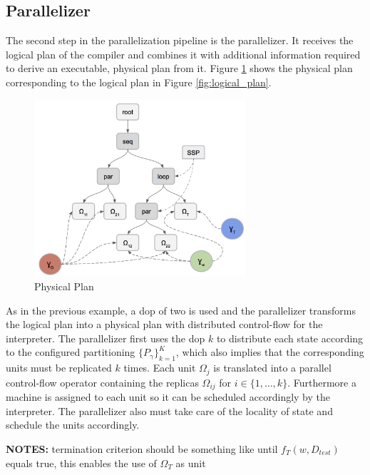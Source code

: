 \subsection{Parallelizer}
The second step in the parallelization pipeline is the parallelizer.
It receives the logical plan of the compiler and combines it with additional information required to derive an executable, physical plan from it.
Figure \ref{fig:physical_plan} shows the physical plan corresponding to the logical plan in Figure \ref{fig:logical_plan}.
\begin{figure}[ht]
\centering
\includegraphics[width=0.7\textwidth]{img/physical_plan.png}
\caption{Physical Plan}
\label{fig:physical_plan}
\end{figure}
As in the previous example, a dop of two is used and the parallelizer transforms the logical plan into a physical plan with distributed control-flow for the interpreter.
The parallelizer first uses the dop $k$ to distribute each state according to the configured partitioning $\{P_{\gamma}\}_{k=1}^K$, which also implies that the corresponding units must be replicated $k$ times.
Each unit $\Omega_j$ is translated into a parallel control-flow operator containing the replicas $\Omega_{ij}$ for $i \in \{1, \ldots, k\}$.
Furthermore a machine is assigned to each unit so it can be scheduled accordingly by the interpreter.
The parallelizer also must take care of the locality of state and schedule the units accordingly.

\textbf{NOTES:} termination criterion should be something like until $f_T(w, D_{test})$ equals true, this enables the use of $\Omega_T$ as unit
